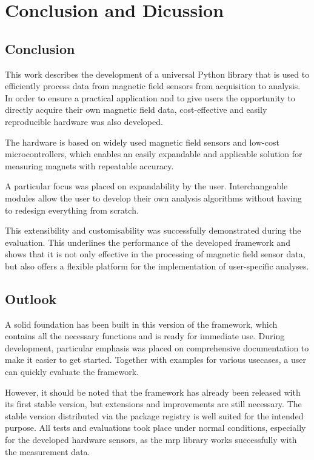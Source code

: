 \hypertarget{conclusion-and-dicussion}{%
\chapter{Conclusion and Dicussion}\label{conclusion-and-dicussion}}

\hypertarget{conclusion}{%
\section{Conclusion}\label{conclusion}}

This work describes the development of a universal Python library that
is used to efficiently process data from magnetic field sensors from
acquisition to analysis. In order to ensure a practical application and
to give users the opportunity to directly acquire their own magnetic
field data, cost-effective and easily reproducible hardware was also
developed.

The hardware is based on widely used magnetic field sensors and low-cost
microcontrollers, which enables an easily expandable and applicable
solution for measuring magnets with repeatable accuracy.

A particular focus was placed on expandability by the user.
Interchangeable modules allow the user to develop their own analysis
algorithms without having to redesign everything from scratch.

This extensibility and customisability was successfully demonstrated
during the evaluation. This underlines the performance of the developed
framework and shows that it is not only effective in the processing of
magnetic field sensor data, but also offers a flexible platform for the
implementation of user-specific analyses.

\hypertarget{outlook}{%
\section{Outlook}\label{outlook}}

A solid foundation has been built in this version of the framework,
which contains all the necessary functions and is ready for immediate
use. During development, particular emphasis was placed on comprehensive
documentation to make it easier to get started. Together with examples
for various usecases, a user can quickly evaluate the framework.

However, it should be noted that the framework has already been released
with its first stable version, but extensions and improvements are still
necessary. The stable version distributed via the package registry is
well suited for the intended purpose. All tests and evaluations took
place under normal conditions, especially for the developed hardware
sensors, as the \gls{mrp} library works successfully with the
measurement data.

